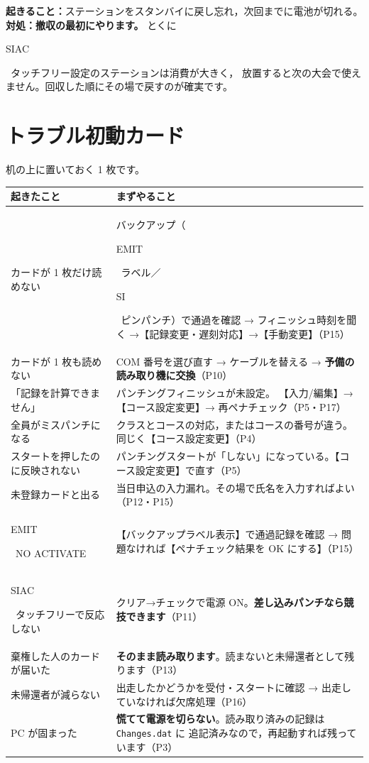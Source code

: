 \documentclass[a4paper,10pt]{ltjsarticle}
\DeclareRobustCommand{\tg}[2]{{\colorbox{#1}{\color{white}\sffamily\bfseries\scriptsize\strut #2}}}
\DeclareRobustCommand{\tSI}{\tg{cSI}{SI}}
\DeclareRobustCommand{\tEMIT}{\tg{cEMIT}{EMIT}}
\DeclareRobustCommand{\tSIAC}{\tg{cSIAC}{SIAC}}
\newcommand{\hd}[1]{\textbf{#1}}
\begin{document}
\begin{Fail}
\textbf{起きること：}ステーションをスタンバイに戻し忘れ，次回までに電池が切れる。\\
\textbf{対処：}\textbf{撤収の最初にやります。}
とくに \tSIAC\ タッチフリー設定のステーションは消費が大きく，
放置すると次の大会で使えません。回収した順にその場で戻すのが確実です。
\end{Fail}

\clearpage
\section*{トラブル初動カード}

机の上に置いておく 1 枚です。

\begin{center}
\small
\begin{tabular}{@{}P{44mm}P{104mm}@{}}
\toprule
\hd{起きたこと} & \hd{まずやること} \\
\midrule
カードが 1 枚だけ読めない
  & バックアップ（\tEMIT\ ラベル／\tSI\ ピンパンチ）で通過を確認 →
    フィニッシュ時刻を聞く →【記録変更・遅刻対応】→【手動変更】（P15） \\
\midrule
カードが 1 枚も読めない
  & COM 番号を選び直す → ケーブルを替える → \textbf{予備の読み取り機に交換}（P10） \\
\midrule
「記録を計算できません」
  & パンチングフィニッシュが未設定。
    【入力/編集】→【コース設定変更】→ 再ペナチェック（P5・P17） \\
\midrule
全員がミスパンチになる
  & クラスとコースの対応，またはコースの番号が違う。同じく【コース設定変更】（P4） \\
\midrule
スタートを押したのに反映されない
  & パンチングスタートが「しない」になっている。【コース設定変更】で直す（P5） \\
\midrule
未登録カードと出る
  & 当日申込の入力漏れ。その場で氏名を入力すればよい（P12・P15） \\
\midrule
\tEMIT\ NO ACTIVATE
  & 【バックアップラベル表示】で通過記録を確認 →
    問題なければ【ペナチェック結果を OK にする】（P15） \\
\midrule
\tSIAC\ タッチフリーで反応しない
  & クリア→チェックで電源 ON。\textbf{差し込みパンチなら競技できます}（P11） \\
\midrule
棄権した人のカードが届いた
  & \textbf{そのまま読み取ります}。読まないと未帰還者として残ります（P13） \\
\midrule
未帰還者が減らない
  & 出走したかどうかを受付・スタートに確認 → 出走していなければ欠席処理（P16） \\
\midrule
PC が固まった
  & \textbf{慌てて電源を切らない}。読み取り済みの記録は \texttt{Changes.dat} に
    追記済みなので，再起動すれば残っています（P3） \\
\bottomrule
\end{tabular}
\end{center}
\end{document}
